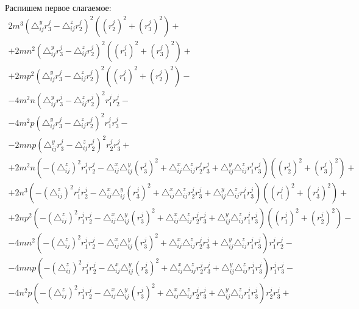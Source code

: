 Распишем первое слагаемое:
$$\begin{gathered}
	2 m^3 \left( \triangle_{ij}^y r_3^j - \triangle_{ij}^z r_2^j \right)^2\left((r_2^j)^2 + (r_3^j)^2\right) + \\
	+ 2 m n^2 \left( \triangle_{ij}^y r_3^j - \triangle_{ij}^z r_2^j \right)^2 \left((r_1^j)^2 + (r_3^j)^2\right) + \\
	+ 2 m p^2 \left( \triangle_{ij}^y r_3^j - \triangle_{ij}^z r_2^j \right)^2 \left((r_1^j)^2 + (r_2^j)^2\right) - \\
	- 4 m^2 n \left( \triangle_{ij}^y r_3^j - \triangle_{ij}^z r_2^j \right)^2 r_1^j r_2^j - \\
	- 4 m^2 p \left( \triangle_{ij}^y r_3^j - \triangle_{ij}^z r_2^j \right)^2 r_1^j r_3^j - \\
	- 2 m n p \left( \triangle_{ij}^y r_3^j - \triangle_{ij}^z r_2^j \right)^2 r_2^j r_3^j + \\
	+ 2 m^2 n \left( - \left( \triangle_{ij}^z \right)^2 r_1^j r_2^j - \triangle_{ij}^x \triangle_{ij}^y (r_3^j)^2 + \triangle_{ij}^x  \triangle_{ij}^z r_2^j r_3^j + \triangle_{ij}^y  \triangle_{ij}^z r_1^j r_3^j \right) \left((r_2^j)^2 + (r_3^j)^2\right) + \\
	+ 2 n^3 \left( - \left( \triangle_{ij}^z \right)^2 r_1^j r_2^j - \triangle_{ij}^x \triangle_{ij}^y (r_3^j)^2 + \triangle_{ij}^x  \triangle_{ij}^z r_2^j r_3^j + \triangle_{ij}^y  \triangle_{ij}^z r_1^j r_3^j \right) \left((r_1^j)^2 + (r_3^j)^2\right) + \\
	+ 2 n p^2 \left( - \left( \triangle_{ij}^z \right)^2 r_1^j r_2^j - \triangle_{ij}^x \triangle_{ij}^y (r_3^j)^2 + \triangle_{ij}^x  \triangle_{ij}^z r_2^j r_3^j + \triangle_{ij}^y  \triangle_{ij}^z r_1^j r_3^j \right) \left((r_1^j)^2 + (r_2^j)^2\right) - \\
	- 4 m n^2 \left( - \left( \triangle_{ij}^z \right)^2 r_1^j r_2^j - \triangle_{ij}^x \triangle_{ij}^y (r_3^j)^2 + \triangle_{ij}^x  \triangle_{ij}^z r_2^j r_3^j + \triangle_{ij}^y  \triangle_{ij}^z r_1^j r_3^j \right) r_1^j r_2^j - \\
	- 4 m n p \left( - \left( \triangle_{ij}^z \right)^2 r_1^j r_2^j - \triangle_{ij}^x \triangle_{ij}^y (r_3^j)^2 + \triangle_{ij}^x  \triangle_{ij}^z r_2^j r_3^j + \triangle_{ij}^y  \triangle_{ij}^z r_1^j r_3^j \right) r_1^j r_3^j - \\
	- 4 n^2 p \left( - \left( \triangle_{ij}^z \right)^2 r_1^j r_2^j - \triangle_{ij}^x \triangle_{ij}^y (r_3^j)^2 + \triangle_{ij}^x  \triangle_{ij}^z r_2^j r_3^j + \triangle_{ij}^y  \triangle_{ij}^z r_1^j r_3^j \right) r_2^j r_3^j + \\

\end{gathered}$$

